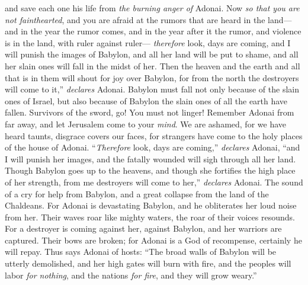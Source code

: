 \begin{biblechapter}
and save each one his life 
from \textit{the burning anger of} Adonai.
\verse Now \textit{so that you are not fainthearted}, 
and you are afraid at the rumors that are heard in the land— 
and in the year the rumor comes, 
and in the year after it the rumor, 
and violence is in the land, 
with ruler against ruler—
\verse \textit{therefore} look, days are coming, 
and I will punish the images of Babylon, 
and all her land will be put to shame, 
and all her slain ones will fall in the midst of her.
\verse Then the heaven and the earth and all that is in them 
will shout for joy over Babylon, 
for from the north 
the destroyers will come to it,” \textit{declares} Adonai.
\verse Babylon must fall not only because of the slain ones of Israel, 
but also because of Babylon the slain ones of all the earth have fallen.
\verse Survivors of the sword, go! 
You must not linger! 
Remember Adonai from far away, 
and let Jerusalem come to your \textit{mind}.
\verse We are ashamed, 
for we have heard taunts, 
disgrace covers our faces, 
for strangers have come to the holy places of the house of Adonai.
\verse “\textit{Therefore} look, days are coming,” \textit{declares} Adonai, 
“and I will punish her images, 
and the fatally wounded will sigh through all her land.
\verse Though Babylon goes up to the heavens, 
and though she fortifies the high place of her strength, 
from me destroyers will come to her,” \textit{declares} Adonai.
\verse The sound of a cry for help from Babylon, 
and a great collapse from the land of the Chaldeans.
\verse For Adonai is devastating Babylon, 
and he obliterates her loud noise from her. 
Their waves roar like mighty waters, 
the roar of their voices resounds.
\verse For a destroyer is coming against her, against Babylon, 
and her warriors are captured. 
Their bows are broken; 
for Adonai is a God of recompense, 
certainly he will repay.
\verse Thus says Adonai of hosts: “The broad walls of Babylon will be utterly demolished, 
and her high gates will burn with fire, 
and the peoples will labor \textit{for nothing}, 
and the nations \textit{for fire}, 
and they will grow weary.”

\end{biblechapter}
